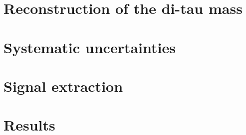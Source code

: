\documentclass[12pt,lot,lof]{puthesis}
\begin{document}
\chapter{Reconstruction of the di-tau mass}
\label{chapter:ch-11:reconstruction-of-di-tau-mass}


\chapter{Systematic uncertainties}
\label{chapter:ch-12:systematic-uncertainties}


\chapter{Signal extraction}
\label{chapter:ch-13:signal-extraction}


\chapter{Results}

% 

 \label{bib}
\end{document}
